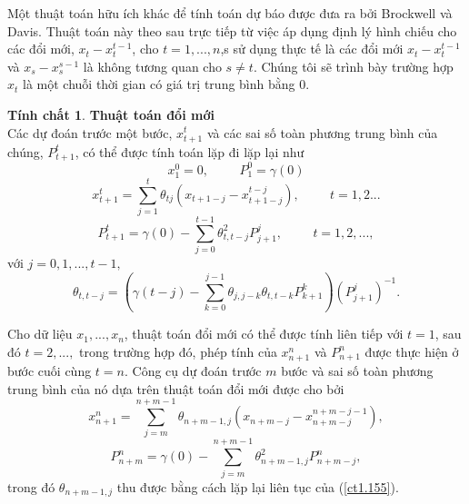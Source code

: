 \documentclass[12pt, a4paper,oneside]{book}
\theoremstyle{definition}
\newtheorem{tc}[theo]{Tính chất}
\begin{document}
Một thuật toán hữu ích khác để tính toán dự báo được đưa ra bởi Brockwell và Davis. Thuật toán này theo sau trực tiếp từ việc áp dụng định lý hình chiếu cho các đổi mới, $x_{t} - x_{t}^{t-1}$, cho $t = 1 ,..., n$,s sử dụng thực tế là các đổi mới $x_{t} - x_{t}^{t-1}$ và $x_{s} - x_{s}^{s-1}$ là không tương quan cho $s \neq t$. Chúng tôi sẽ trình bày trường hợp $x_{t}$ là một chuỗi thời gian có giá trị trung bình bằng $0$.
\begin{tc}\textbf{Thuật toán đổi mới}\\
Các dự đoán trước một bước, $x_{t+1}^{t}$ và các sai số toàn phương trung bình của chúng, $P_{t+1}^{t}$, có thể được tính toán lặp đi lặp lại như
$$x_{1}^{0}=0, \hspace{1cm} P_{1}^{0} =\gamma(0) $$
\begin{equation}
x_{t+1}^{t} = \sum_{j=1}^{t}\theta_{tj}(x_{t+1-j} - x_{t+1-j}^{t-j}), \hspace{1cm} t= 1,2... \label{ct1.153}
\end{equation}	
\begin{equation}
P_{t+1}^{t} = \gamma(0) - \sum_{j=0}^{t-1}\theta^{2}_{t,t-j}P_{j+1}^{j}, \hspace{1cm}  t=1,2,...,\label{ct1.154}
\end{equation}
với $j=0,1,...,t-1,$
\begin{equation}
\theta_{t,t-j}= (\gamma(t-j) - \sum_{k=0}^{j-1}\theta_{j,j-k}\theta_{t,t-k}P_{k+1}^{k})(P_{j+1}^{j})^{-1}.\label{ct1.155}
\end{equation}
\end{tc}
	
Cho dữ liệu $x_{1} ,..., x_{n}$, thuật toán đổi mới có thể được tính liên tiếp với $t = 1$, sau đó $t = 2,...,$ trong trường hợp đó, phép tính của $x^{n}_{n+1}$ và $P^{n}_{n+1}$ được thực hiện ở bước cuối cùng $t = n$. Công cụ dự đoán trước $m$ bước và sai số toàn phương trung bình của nó dựa trên thuật toán đổi mới được cho bởi
\begin{equation}
x_{n+1}^{n} = \sum_{j=m}^{n+m-1}\theta_{n+m-1,j}(x_{n+m-j}- x^{n+m-j-1}_{n+m-j}), \label{ct1.156}
\end{equation}
\begin{equation}
P_{n+m}^{n}=  \gamma(0) - \sum_{j=m}^{n+m-1}\theta^{2}_{n+m-1,j}P_{n+m-j}^{n}, \label{ct1.157}
\end{equation}	
trong đó $\theta_{n+m-1,j}$ thu được bằng cách lặp lại liên tục của (\ref{ct1.155}).
\end{document}
